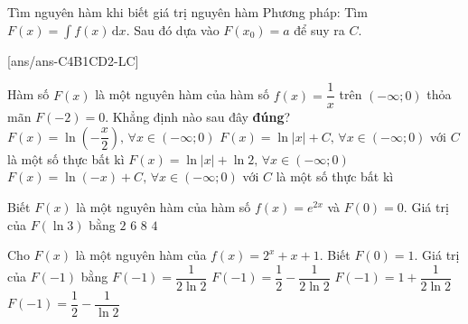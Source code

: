 \begin{dang}{Tìm nguyên hàm khi biết giá trị nguyên hàm}
	Phương pháp: Tìm $F(x)=\int f(x)\mathrm{\,d}x$. Sau đó dựa vào $F(x_0)=a$ để suy ra $C$.
\end{dang}
[ans/ans-C4B1CD2-LC]
\begin{ex}%
Hàm số $F(x)$ là một nguyên hàm của hàm số $f(x)=\dfrac{1}{x}$ trên $(-\infty;0)$ thỏa mãn $F(-2)=0$. Khẳng định nào sau đây \textbf{đúng}?
\choice
{\True $F(x)=\ln\left(-\dfrac{x}{2} \right),\,\forall x\in (-\infty;0)$}
{$F(x)=\ln\left|x\right|+C,\,\forall x\in (-\infty;0)$ với $C$ là một số thực bất kì}
{$F(x)=\ln\left|x\right|+\ln 2,\,\forall x\in (-\infty;0)$}
{$F(x)=\ln\left(-x\right)+C,\,\forall x\in (-\infty;0)$ với $C$ là một số thực bất kì}
\end{ex}

\begin{ex}%
Biết $F(x)$ là một nguyên hàm của hàm số $f(x)=e^{2x}$ và $F(0)=0$. Giá trị của $F(\ln 3)$ bằng
\choice
{$2$}
{$6$}
{$8$}
{\True $4$}
\end{ex}

\begin{ex}%
Cho $F(x)$ là một nguyên hàm của $f(x)=2^x+x+1$. Biết $F(0)=1$. Giá trị của $F(-1)$ bằng
\choice
{$F(-1)=\dfrac{1}{2\ln 2}$}
{\True $F(-1)=\dfrac{1}{2}-\dfrac{1}{2\ln 2}$}
{$F(-1)=1+\dfrac{1}{2\ln 2}$}
{$F(-1)=\dfrac{1}{2}-\dfrac{1}{\ln 2}$}
\end{ex}


